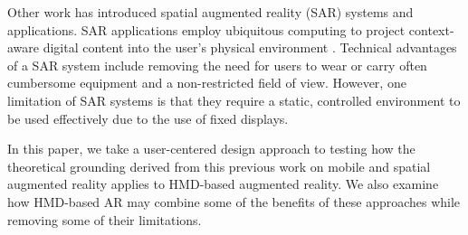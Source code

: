 Other work has introduced spatial augmented reality (SAR) systems and applications.  SAR applications employ ubiquitous computing to project context-aware digital content into the user's physical environment \cite{benko2015fovear,benko2014dyadic}.  Technical advantages of a SAR system include removing the need for users to wear or carry often cumbersome equipment and a non-restricted field of view.   %
However, one limitation of SAR systems is that they require a static, controlled environment to be used effectively due to the use of fixed displays. 

In this paper, we take a user-centered design approach to testing how the theoretical grounding derived from this previous work on mobile and spatial augmented reality applies to HMD-based augmented reality.  We also examine how HMD-based AR may combine some of the benefits of these approaches while removing some of their limitations.